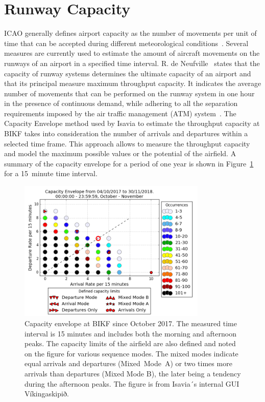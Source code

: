 \section{Runway Capacity\label{sec:runway_capacity}}

ICAO generally defines airport capacity as the number of movements per unit of time that can be accepted during different meteorological conditions~\cite{airport_capacity_methodology}. 
Several measures are currently used to estimate the amount of aircraft movements on the runways of an airport in a specified time interval.
R. de Neufville~\cite{de_neufville_airport_2013} states that the capacity of runway systems determines the ultimate capacity of an airport and that its principal measure maximum throughput capacity. It indicates the average number of movements that can be performed on the runway system in one hour in the presence of continuous demand, while adhering to all the separation requirements imposed by the air traffic management (ATM) system~\cite{de_neufville_airport_2013}.
The Capacity Envelope method used by Isavia to estimate the throughput capacity at BIKF takes into consideration the number of arrivals and departures within a selected time frame. This approach allows to measure the throughput capacity and model the maximum possible values or the potential of the airfield. A summary of the capacity envelope for a period of one year is shown in Figure~\ref{fig:capacity_evnelope} for a 15~minute time interval. 

\begin{figure}[h]
    \centering
    \includegraphics[width=0.8\textwidth]{graphics/fig_Capacity_Envelope_2017-10-04_to_2018-11-30_15min_occurrences_limits.png}
    \caption[Capacity envelope for BIKF]{Capacity envelope at BIKF since October 2017. The measured time interval is 15 minutes and includes both the morning and afternoon peaks. The capacity limits of the airfield are also defined and noted on the figure for various sequence modes. The mixed modes indicate equal arrivals and departures (Mixed~Mode~A) or two times more arrivals than departures (Mixed Mode B), the later being a tendency during the afternoon peaks. The figure is from Isavia´s internal GUI Víkingaskipið.}  \label{fig:capacity_evnelope}
\end{figure}

